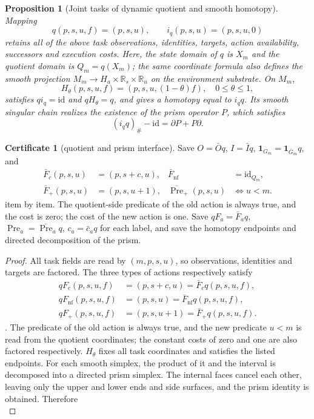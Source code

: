 \documentclass[12pt,a4paper,openany,notitlepage]{report}
\theoremstyle{plain}
\newtheorem{proposition}[theorem]{Proposition}
\theoremstyle{definition}
\newtheorem*{certificate}{Certificate}
\theoremstyle{remark}
\begin{document}
\begin{CJK*}
\begin{proposition}
[Joint tasks of dynamic quotient and smooth homotopy]\label{hgov:prop:jointquotient}
Mapping \[
q(p,s,u,f)=(p,s,u),\qquad i_q(p,s,u)=(p,s,u,0)
\] retains all of the above task observations, identities, targets, action availability, successors and execution costs. Here, the state domain of $q$ is $X_m$ and the quotient domain is $Q_m=q(X_m)$; the same coordinate formula also defines the smooth projection $M_m\to H_a\times\mathbb R_s\times\mathbb R_u$ on the environment substrate. On $M_m$, \[
H_\theta(p,s,u,f)=(p,s,u,(1-\theta)f),\quad 0\le\theta\le1,
\] satisfies $qi_q=\mathrm{id}$ and $qH_\theta=q$, and gives a homotopy equal to $i_qq$. Its smooth singular chain realizes the existence of the prism operator $P$, which satisfies \[
(i_qq)_\#-\mathrm{id}=\partial P+P\partial.
\]\end{proposition}
\begin{certificate}
[quotient and prism interface]Save $O=\bar Oq$, $I=\bar Iq$, $\mathbf1_{G_m}=\mathbf1_{\bar G_m}q$, and \[
 \begin{aligned}
 \bar F_c(p,s,u)&=(p,s+c,u),&
 \bar F_{\mathrm{nf}}&=\mathrm{id}_{Q_m},\\
 \bar F_+(p,s,u)&=(p,s,u+1),&
 \overline{\operatorname{Pre}}_+(p,s,u)&\iff u<m.
 \end{aligned}
\] item by item. The quotient-side predicate of the old action is always true, and the cost is zero; the cost of the new action is one. Save $qF_a=\bar F_aq$, $\operatorname{Pre}_a=\overline{\operatorname{Pre}}_a q$, $c_a=\bar c_aq$ for each label, and save the homotopy endpoints and directed decomposition of the prism.\end{certificate}
\begin{proof}
All task fields are read by $(m,p,s,u)$, so observations, identities and targets are factored. The three types of actions respectively satisfy \[
 \begin{aligned}
 qF_c(p,s,u,f)&=(p,s+c,u)=\bar F_cq(p,s,u,f),\\
 qF_{\mathrm{nf}}(p,s,u,f)&=(p,s,u)=\bar F_{\mathrm{nf}}q(p,s,u,f),\\
 qF_+(p,s,u,f)&=(p,s,u+1)=\bar F_+q(p,s,u,f).
 \end{aligned}
\]. The predicate of the old action is always true, and the new predicate $u<m$ is read from the quotient coordinates; the constant costs of zero and one are also factored respectively. $H_\theta$ fixes all task coordinates and satisfies the listed endpoints. For each smooth simplex, the product of it and the interval is decomposed into a directed prism simplex. The internal faces cancel each other, leaving only the upper and lower ends and side surfaces, and the prism identity \cite{ExtHatcher,S38} is obtained. Therefore \[
\]
\end{proof}
\end{CJK*}
\end{document}

